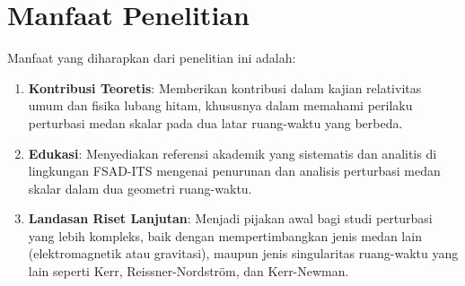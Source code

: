 \section{Manfaat Penelitian}

Manfaat yang diharapkan dari penelitian ini adalah:
\begin{enumerate}
    \item \textbf{Kontribusi Teoretis}: Memberikan kontribusi dalam kajian relativitas umum dan fisika lubang hitam, khususnya dalam memahami perilaku perturbasi medan skalar pada dua latar ruang-waktu yang berbeda.
    \item \textbf{Edukasi}: Menyediakan referensi akademik yang sistematis dan analitis di lingkungan FSAD-ITS mengenai penurunan dan analisis perturbasi medan skalar dalam dua geometri ruang-waktu.
    \item \textbf{Landasan Riset Lanjutan}: Menjadi pijakan awal bagi studi perturbasi yang lebih kompleks, baik dengan mempertimbangkan jenis medan lain (elektromagnetik atau gravitasi), maupun jenis singularitas ruang-waktu yang lain seperti Kerr, Reissner-Nordstr\"{o}m, dan Kerr-Newman.
\end{enumerate}
